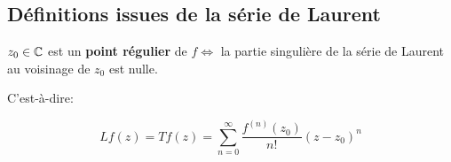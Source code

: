 \subsection{Définitions issues de la série de Laurent}

\begin{definition}[1]
    $z_0 \in \mathbb{C}$ est un \textbf{point régulier} de $f \iff$ la partie singulière de la série de Laurent au voisinage de $z_0$ est nulle.
    
    C'est-à-dire:
    
    \[ Lf(z) = Tf(z) = \sum_{n = 0}^{\infty} \frac{f^{(n)}(z_0)}{n!} (z - z_0)^n \]
\end{definition}























